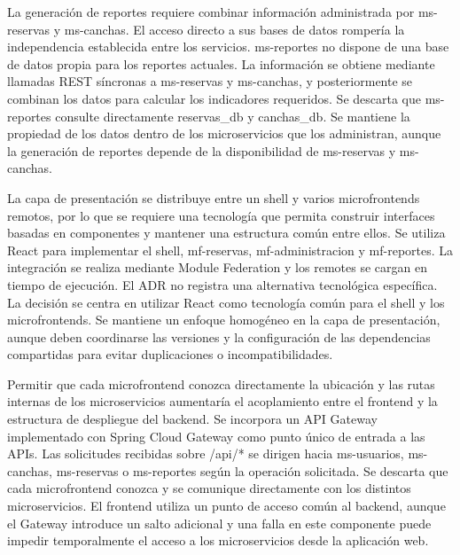   {La generación de reportes requiere combinar información administrada por
  ms-reservas y ms-canchas. El acceso directo a sus bases de datos rompería la
  independencia establecida entre los servicios.}
  {ms-reportes no dispone de una base de datos propia para los reportes actuales.
  La información se obtiene mediante llamadas REST síncronas a ms-reservas y
  ms-canchas, y posteriormente se combinan los datos para calcular los indicadores
  requeridos.}
  {Se descarta que ms-reportes consulte directamente reservas\_db y canchas\_db.}
  {Se mantiene la propiedad de los datos dentro de los microservicios que los
  administran, aunque la generación de reportes depende de la disponibilidad de
  ms-reservas y ms-canchas.}

  {La capa de presentación se distribuye entre un shell y varios microfrontends
  remotos, por lo que se requiere una tecnología que permita construir interfaces
  basadas en componentes y mantener una estructura común entre ellos.}
  {Se utiliza React para implementar el shell, mf-reservas, mf-administracion y
  mf-reportes. La integración se realiza mediante Module Federation y los remotes
  se cargan en tiempo de ejecución.}
  {El ADR no registra una alternativa tecnológica específica. La decisión se
  centra en utilizar React como tecnología común para el shell y los
  microfrontends.}
  {Se mantiene un enfoque homogéneo en la capa de presentación, aunque deben
  coordinarse las versiones y la configuración de las dependencias compartidas
  para evitar duplicaciones o incompatibilidades.}

  {Permitir que cada microfrontend conozca directamente la ubicación y las rutas
  internas de los microservicios aumentaría el acoplamiento entre el frontend y
  la estructura de despliegue del backend.}
  {Se incorpora un API Gateway implementado con Spring Cloud Gateway como punto
  único de entrada a las APIs. Las solicitudes recibidas sobre /api/* se dirigen
  hacia ms-usuarios, ms-canchas, ms-reservas o ms-reportes según la operación
  solicitada.}
  {Se descarta que cada microfrontend conozca y se comunique directamente con los
  distintos microservicios.}
  {El frontend utiliza un punto de acceso común al backend, aunque el Gateway
  introduce un salto adicional y una falla en este componente puede impedir
  temporalmente el acceso a los microservicios desde la aplicación web.}

